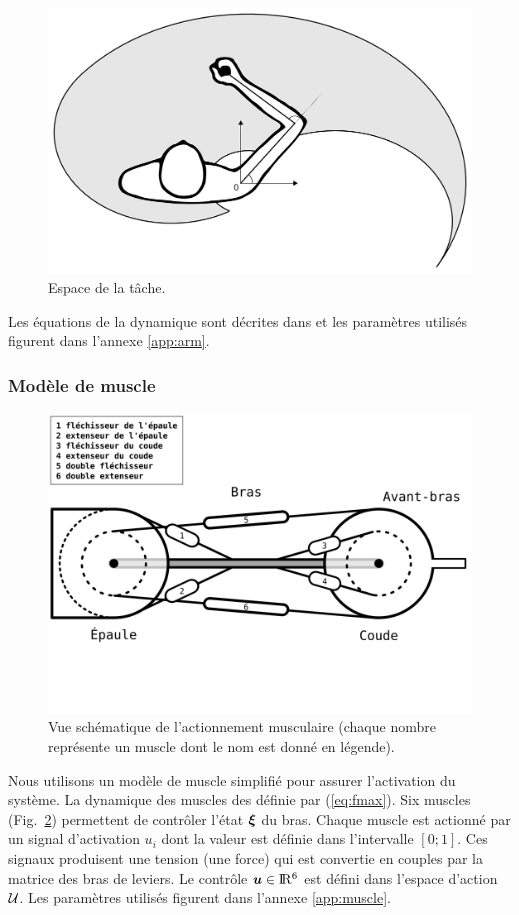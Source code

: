 \documentclass[pdftex,a4paper,11pt]{article}
\begin{document}
\begin{figure}[h]
    \centering
    \includegraphics[width=.80\linewidth]{fig/space}
    \caption{Espace de la tâche.}
    \label{fig:space}
\end{figure}

Les équations de la dynamique sont décrites dans \cite{li2006} et les
paramètres utilisés figurent dans l'annexe \ref{app:arm}.


\subsubsection{Modèle de muscle}

\begin{figure}[h]
    \centering
    \includegraphics[width=.80\linewidth]{fig/muscles_fr}
    \caption{Vue schématique de l'actionnement musculaire (chaque nombre
    représente un muscle dont le nom est donné en légende).}
    \label{fig:muscles}
\end{figure}

Nous utilisons un modèle de muscle simplifié \cite{rigoux11} pour assurer
l'activation du système. La dynamique des muscles des définie par (\ref{eq:fmax}).
Six muscles (Fig.~\ref{fig:muscles}) permettent de contrôler l'état
$\boldsymbol{\xi}$ du bras.  Chaque muscle est actionné par un signal d'activation $u_i$
dont la valeur est définie dans l'intervalle $[0 ; 1]$.  Ces signaux produisent
une tension (une force) qui est convertie en couples par la matrice des bras de
leviers. Le contrôle $\boldsymbol{u} \in {{\rm I\!R}}{}^6$ est défini
dans l'espace d'action $\mathcal{U}$.
Les paramètres utilisés figurent dans l'annexe \ref{app:muscle}.
\end{document}

